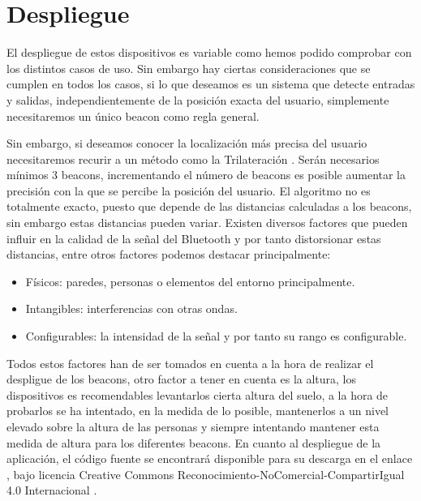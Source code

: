 \section{Despliegue}

El despliegue de estos dispositivos es variable como hemos podido comprobar con los distintos casos de uso. Sin embargo hay ciertas consideraciones que se cumplen en todos los casos, si lo que deseamos es un sistema que detecte entradas y salidas, independientemente de la posición exacta del usuario, simplemente necesitaremos un único beacon como regla general. 


Sin embargo, si deseamos conocer la localización más precisa del usuario necesitaremos recurir a un método como la Trilateración \cite{URL::trilateracion}. Serán necesarios mínimos 3 beacons, incrementando el número de beacons es posible aumentar la precisión con la que se percibe la posición del usuario. El algoritmo no es totalmente exacto, puesto que depende de las distancias calculadas a los beacons, sin embargo estas distancias pueden variar. Existen diversos factores que pueden influir en la calidad de la señal del Bluetooth y por tanto distorsionar estas distancias, entre otros factores podemos destacar principalmente:


\begin{itemize}
\item Físicos:  paredes, personas o elementos del entorno principalmente.
\item Intangibles: interferencias con otras ondas.
\item Configurables: la intensidad de la señal y por tanto su rango es configurable.
\end{itemize}


Todos estos factores han de ser tomados en cuenta a la hora de realizar el despligue de los beacons, otro factor a tener en cuenta es la altura, los dispositivos es recomendables levantarlos cierta altura del suelo, a la hora de probarlos se ha intentado, en la medida de lo posible, mantenerlos a un nivel elevado sobre la altura de las personas y siempre intentando mantener esta medida de altura para los diferentes beacons. En cuanto al despliegue de la aplicación, el código fuente se encontrará disponible para su descarga en el enlace \cite{URL::repositorioAplicacion}, bajo licencia Creative Commons Reconocimiento-NoComercial-CompartirIgual 4.0 Internacional \cite{URL::licencia}.
 
